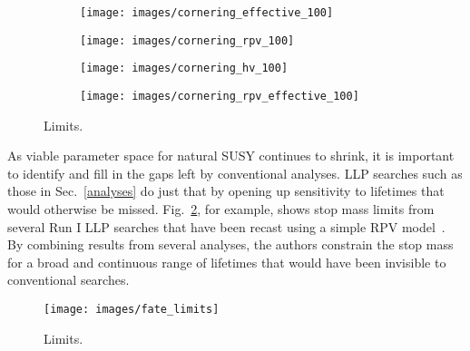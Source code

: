 \documentclass[12pt]{article}
\begin{document}
        \noindent \begin{figure}[htbp] \begin{center}
        \begin{subfigure}[htbp]{0.3\textwidth} \begin{center}
        \texttt{[image: images/cornering\_effective\_100]}
        \end{center} \end{subfigure}
        \begin{subfigure}[htbp]{0.3\textwidth} \begin{center}
        \texttt{[image: images/cornering\_rpv\_100]}
        \end{center} \end{subfigure}
        \begin{subfigure}[htbp]{0.3\textwidth} \begin{center}
        \texttt{[image: images/cornering\_hv\_100]}
        \end{center} \end{subfigure}
        \begin{subfigure}[htbp]{0.3\textwidth} \begin{center}
        \texttt{[image: images/cornering\_rpv\_effective\_100]}
        \end{center} \end{subfigure}
        \caption{Limits.~\cite{cornering}}
        \label{cornering_limits}
        \end{center} \end{figure}

    As viable parameter space for natural SUSY continues to shrink, it is important to identify and fill in the gaps left by conventional analyses. LLP searches such as those in Sec.~\ref{analyses} do just that by opening up sensitivity to lifetimes that would otherwise be missed. Fig.~\ref{fate_limits}, for example, shows stop mass limits from several Run I LLP searches that have been recast using a simple RPV model~\cite{fate}. By combining results from several analyses, the authors constrain the stop mass for a broad and continuous range of lifetimes that would have been invisible to conventional searches. 

        \noindent \begin{figure}[htbp] \begin{center}
        \texttt{[image: images/fate\_limits]}
        \caption{Limits.~\cite{fate}}
        \label{fate_limits}
        \end{center} \end{figure}
\end{document}
